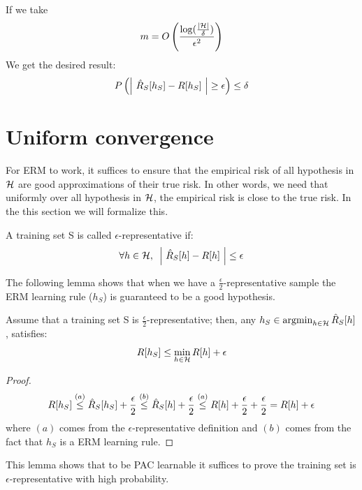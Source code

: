 \documentclass{article}
\DeclareMathOperator*{\argmin}{argmin}
\begin{document}
If we take $$m = O\left(\frac{\log(\frac{|\mathcal{H}|}{\delta})}{\epsilon^2}\right)$$
We get the desired result:
\begin{align*}
    P\left( \left| \ \hat{R}_S[h_S] - R[h_S] \ \right| \ge \epsilon\right) \le \delta
\end{align*}

\section{Uniform convergence}
For ERM to work, it suffices to ensure that the empirical risk of all hypothesis in $\mathcal{H}$ are good approximations of their true risk. In other words, we need that uniformly over all hypothesis in $\mathcal{H}$, the empirical risk is close to the true risk. In the this section we will formalize this.
\begin{defn}
A training set S is called $\epsilon$-representative  if:
$$
\forall h \in \HH, \,\,\, \left| \ \Rhat[h] - R[h] \ \right| \le \epsilon
$$
\end{defn}
The following lemma shows that when we have a $\frac{\epsilon}{2}$-representative sample the ERM learning rule ($h_S$) is guaranteed to be a good hypothesis.
\begin{lemma}
Assume that a training set S is $\frac{\epsilon}{2}$-representative; then, any $h_S \in \argmin_{h \in \HH} \Rhat[h]$, satisfies:
$$
R[h_S] \leq \underset{h \in \mathcal{H}}{\min}\, R[h] + \epsilon
$$
\end{lemma}
\begin{proof}
$$
R[h_S] \overset{(a)}{\leq} \hat{R}_S[h_S]  + \frac{\epsilon}{2} \overset{(b)}{\leq} \hat{R}_S[h]  + \frac{\epsilon}{2} \overset{(a)}{\leq} R[h] + \frac{\epsilon}{2} + \frac{\epsilon}{2} = R[h] + \epsilon
$$
where $(a)$ comes from the $\epsilon$-representative definition and $(b)$ comes from the fact that $h_S$ is a ERM learning rule.
\end{proof}
This lemma shows that to be PAC learnable it suffices to prove the training set is $\epsilon$-representative with high probability.
\end{document}
